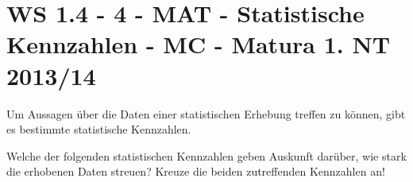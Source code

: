 \section{WS 1.4 - 4 - MAT - Statistische Kennzahlen - MC - Matura 1. NT 2013/14}

\begin{beispiel}[WS 1.4]{1} %
				Um Aussagen über die Daten einer statistischen Erhebung treffen zu können, gibt es bestimmte statistische Kennzahlen.

Welche der folgenden statistischen Kennzahlen geben Auskunft darüber, wie stark die erhobenen Daten streuen? Kreuze die beiden zutreffenden Kennzahlen an!\leer

\end{beispiel}